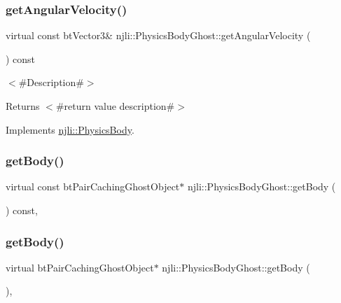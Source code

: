 \subsubsection{\texorpdfstring{get\+Angular\+Velocity()}{getAngularVelocity()}}
{\footnotesize\ttfamily virtual const bt\+Vector3\& njli\+::\+Physics\+Body\+Ghost\+::get\+Angular\+Velocity (\begin{DoxyParamCaption}{ }\end{DoxyParamCaption}) const\hspace{0.3cm}{\ttfamily [virtual]}}

$<$\#\+Description\#$>$

\begin{DoxyReturn}{Returns}
$<$\#return value description\#$>$ 
\end{DoxyReturn}


Implements \mbox{\hyperlink{classnjli_1_1_physics_body_a598de298accae3b59c821ab8e640d464}{njli\+::\+Physics\+Body}}.

\mbox{\label{classnjli_1_1_physics_body_ghost_ab25cf5362db7227eafe8db536905d078}} 
\subsubsection{\texorpdfstring{get\+Body()}{getBody()}\hspace{0.1cm}{\footnotesize\ttfamily [1/2]}}
{\footnotesize\ttfamily virtual const bt\+Pair\+Caching\+Ghost\+Object$\ast$ njli\+::\+Physics\+Body\+Ghost\+::get\+Body (\begin{DoxyParamCaption}{ }\end{DoxyParamCaption}) const\hspace{0.3cm}{\ttfamily [protected]}, {\ttfamily [virtual]}}

\mbox{\label{classnjli_1_1_physics_body_ghost_a2d883e17713153e92b13c0a7ad324c25}} 
\subsubsection{\texorpdfstring{get\+Body()}{getBody()}\hspace{0.1cm}{\footnotesize\ttfamily [2/2]}}
{\footnotesize\ttfamily virtual bt\+Pair\+Caching\+Ghost\+Object$\ast$ njli\+::\+Physics\+Body\+Ghost\+::get\+Body (\begin{DoxyParamCaption}{ }\end{DoxyParamCaption})\hspace{0.3cm}{\ttfamily [protected]}, {\ttfamily [virtual]}}

